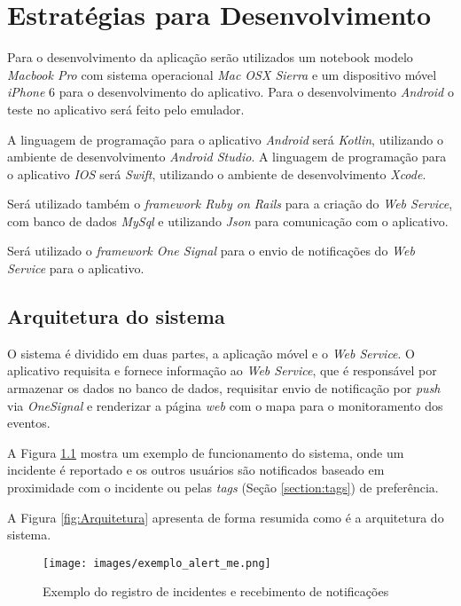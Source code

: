 \documentclass[	12pt, Times, openright, twoside, a4paper, english, brazil]{abntex2}
\begin{document}
\chapter{Estratégias para Desenvolvimento}
\label{chapter:estrategias}
Para o desenvolvimento da aplicação serão utilizados um notebook modelo \textit{Macbook Pro} com sistema operacional \textit{Mac OSX Sierra} e um dispositivo móvel \textit{iPhone} 6 para o desenvolvimento do aplicativo. Para o desenvolvimento \textit{Android} o teste no aplicativo será feito pelo emulador.

A linguagem de programação para o aplicativo \textit{Android} será \textit{Kotlin}, utilizando o ambiente de desenvolvimento \textit{Android Studio}. 
A linguagem de programação para o aplicativo \textit{IOS} será \textit{Swift}, utilizando o ambiente de desenvolvimento \textit{Xcode}.

Será utilizado também o \textit{framework Ruby on Rails} para a criação do \textit{Web Service}, com banco de dados \textit{MySql} e utilizando \textit{Json} para comunicação com o aplicativo.

Será utilizado o \textit{framework One Signal} para o envio de notificações do \textit{Web Service} para o aplicativo.

\section{Arquitetura do sistema}
O sistema é dividido em duas partes, a aplicação móvel e o \textit{Web Service}. O aplicativo requisita e fornece informação ao \textit{Web Service}, que é responsável por armazenar os dados no banco de dados, requisitar envio de notificação por \textit{push} via \textit{OneSignal} e renderizar a página \textit{web} com o mapa para o monitoramento dos eventos. 

A Figura \ref{fig:Exemplo} mostra um exemplo de funcionamento do sistema, onde um incidente é reportado e os outros usuários são notificados baseado em proximidade com o incidente ou pelas \textit{tags} (Seção \ref{section:tags}) de preferência.

A Figura \ref{fig:Arquitetura} apresenta de forma resumida como é a arquitetura do sistema. 

\begin{figure}[h]
\centering %
\texttt{[image: images/exemplo\_alert\_me.png]} %
\caption{Exemplo do registro de incidentes e recebimento de notificações}
\label{fig:Exemplo}
\end{figure}
\end{document}
